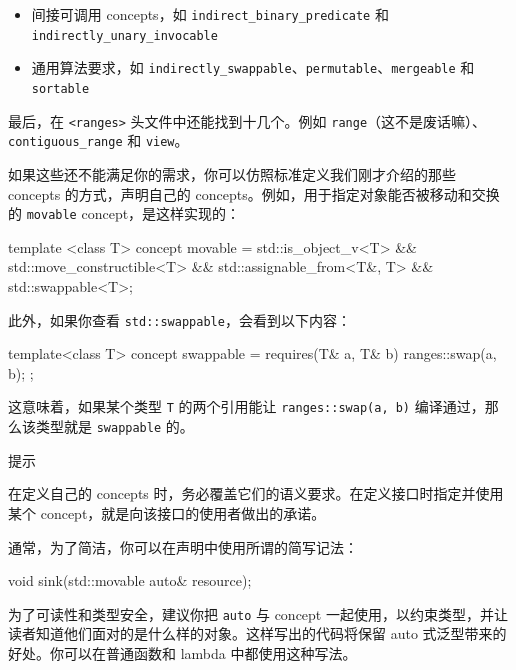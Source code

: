 \begin{itemize}
\item 间接可调用 concepts，如 \texttt{indirect\_\allowbreak{}binary\_\allowbreak{}predicate} 和 \texttt{indirectly\_\allowbreak{}unary\_\allowbreak{}invocable}
\item 通用算法要求，如 \texttt{indirectly\_\allowbreak{}swappable}、\texttt{permutable}、\texttt{mergeable} 和 \texttt{sortable}
\end{itemize}

最后，在 \texttt{<ranges>} 头文件中还能找到十几个。例如 \texttt{range}（这不是废话嘛）、\texttt{contiguous\_\allowbreak{}range} 和 \texttt{view}。

如果这些还不能满足你的需求，你可以仿照标准定义我们刚才介绍的那些 concepts 的方式，声明自己的 concepts。例如，用于指定对象能否被移动和交换的 \texttt{movable} concept，是这样实现的：

\begin{codebox}[cpp]
template <class T>
concept movable = std::is_object_v<T> && std::move_constructible<T> && std::assignable_from<T&, T> && std::swappable<T>;
\end{codebox}

此外，如果你查看 \texttt{std::\allowbreak{}swappable}，会看到以下内容：

\begin{codebox}[cpp]
template<class T>
concept swappable = requires(T& a, T& b) { ranges::swap(a, b); };
\end{codebox}

这意味着，如果某个类型 \texttt{T} 的两个引用能让 \texttt{ranges::\allowbreak{}swap(\allowbreak{}a,\allowbreak{} b)\allowbreak{}} 编译通过，那么该类型就是 \texttt{swappable} 的。

\begin{myTip}{提示}

在定义自己的 concepts 时，务必覆盖它们的语义要求。在定义接口时指定并使用某个 concept，就是向该接口的使用者做出的承诺。
\end{myTip}

通常，为了简洁，你可以在声明中使用所谓的简写记法：

\begin{codebox}[cpp]
void sink(std::movable auto& resource);
\end{codebox}

\label{idx:508}
为了可读性和类型安全，建议你把 \texttt{auto} 与 concept 一起使用，以约束类型，并让读者知道他们面对的是什么样的对象。这样写出的代码将保留 auto 式泛型带来的好处。你可以在普通函数和 lambda 中都使用这种写法。

